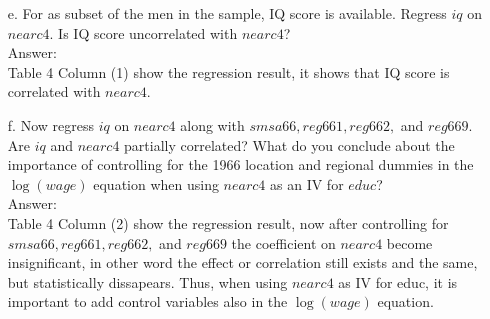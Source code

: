 \documentclass[10pt]{article}
\begin{document}
\begin{enumerate}
\item[e.] For as subset of the men in the sample, IQ score is available. Regress $iq$ on $nearc4.$ Is IQ score uncorrelated with $nearc4$?
\\ Answer:\\
Table 4 Column (1) show the regression result, it shows that IQ score is correlated with $nearc4.$ 


\item[f.] Now regress $iq$ on $nearc4$ along with $smsa66, reg661, reg662,$ and $reg669.$ Are $iq$ and $nearc4$ partially correlated? What do you conclude about the importance of controlling for the 1966 location and regional dummies in the $\log(wage)$ equation when using $nearc4$ as an IV for $educ$?
\\ Answer:\\
Table 4 Column (2) show the regression result, now after controlling for $smsa66, reg661, reg662,$ and $reg669$ the coefficient on $nearc4$ become insignificant, in other word the effect or correlation still exists and the same, but statistically dissapears. Thus, when using $nearc4$ as IV for educ, it is important to add control variables also in the $\log(wage)$ equation.
\end{enumerate}
\end{document}
